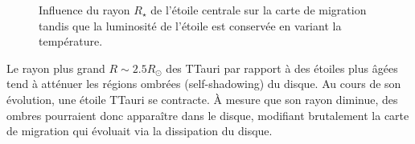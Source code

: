 \begin{figure}[htbp]
\centering
{}
\hfill
{}

\hfill
{}
\caption{Influence du rayon $R_\star$ de l'étoile centrale sur la carte de migration tandis que la luminosité de l'étoile est
conservée en variant la température. }\label{fig:map_TTauri_radius}
\end{figure}

Le rayon plus grand $R\sim 2.5R_\odot$ des TTauri par rapport à des étoiles plus âgées  tend à atténuer les régions ombrées (\og self-shadowing\fg) du disque. Au cours de son évolution, une étoile TTauri se contracte. À mesure que son rayon diminue, des ombres pourraient donc apparaître dans le disque, modifiant brutalement la carte de migration qui évoluait via la dissipation du disque.

